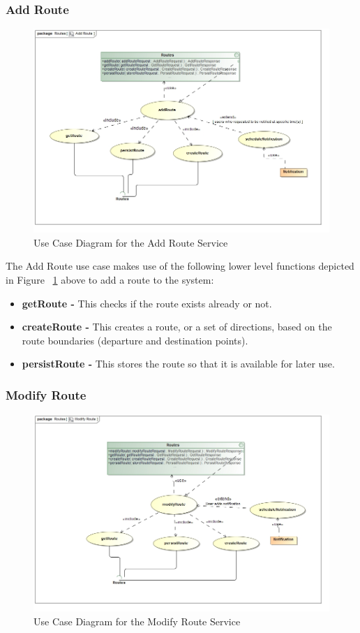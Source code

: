 \documentclass[a4paper,12pt]{article}
\begin{document}
\subsubsection{Add Route}
\begin{figure}[ht]
\includegraphics[width=\textwidth]{images/Add_Route.jpg}
\caption{Use Case Diagram for the Add Route Service}
\label{fig:uc_add}
\end{figure}

The Add Route use case makes use of the following lower level functions depicted in Figure ~\ref{fig:uc_add} above to add a route to the system:
\begin{itemize}
\item \textbf{getRoute -} This checks if the route exists already or not.
\item \textbf{createRoute -} This creates a route, or a set of directions, based on the route boundaries (departure and destination points).
\item \textbf{persistRoute -} This stores the route so that it is available for later use.
\end{itemize}

\subsubsection{Modify Route} 
\begin{figure}[ht]
\includegraphics[width=\textwidth]{images/Modify_Route.jpg}
\caption{Use Case Diagram for the Modify Route Service}
\label{fig:uc_modify}
\end{figure}
\end{document}
